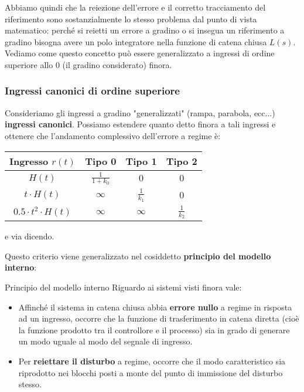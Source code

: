 \documentclass[a4paper,11pt]{article}
\begin{document}
Abbiamo quindi che la reiezione dell'errore e il corretto tracciamento del riferimento sono sostanzialmente lo stesso problema dal punto di vista matematico: perché si reietti un errore a gradino o si insegua un riferimento a gradino bisogna avere un polo integratore nella funzione di catena chiusa $L(s)$.
Vediamo come questo concetto può essere generalizzato a ingressi di ordine superiore allo 0 (il gradino considerato) finora.

\subsubsection{Ingressi canonici di ordine superiore}
Consideriamo gli ingressi a gradino "generalizzati" (rampa, parabola, ecc...) \textbf{ingressi canonici}.
Possiamo estendere quanto detto finora a tali ingressi e ottenere che l'andamento complessivo dell'errore a regime è:
\begin{table}[H]
	\center {}
	\begin{tabular} { c || c | c | c }
		\bfseries Ingresso $r(t)$ & \bfseries Tipo 0 & \bfseries Tipo 1 & \bfseries Tipo 2 \\
		\hline
		$H(t)$ & $\frac{1}{1 + k_0}$ & $0$ & $0$ \\
		$t \cdot H(t)$ & $\infty$ & $\frac{1}{k_1}$ & $0$ \\
		$0.5 \cdot t^2 \cdot H(t)$ & $\infty$ & $\infty$ & $\frac{1}{k_2}$ \\
	\end{tabular}
\end{table}
e via dicendo.

Questo criterio viene generalizzato nel cosiddetto \textbf{principio del modello interno}:
\begin{theorem}{Principio del modello interno}
	Riguardo ai sistemi visti finora vale:
	\begin{itemize}
		\item 
			Affinché il sistema in catena chiusa abbia \textbf{errore nullo} a regime in risposta ad un ingresso, occorre che la funzione di trasferimento in catena diretta (cioè la funzione prodotto tra il controllore e il processo) sia in grado di generare un modo uguale al modo del segnale di ingresso.
		\item
			Per \textbf{reiettare il disturbo} a regime, occorre che il modo caratteristico sia riprodotto nei blocchi posti a monte del punto di immissione del disturbo stesso.
	\end{itemize}
\end{theorem}
\end{document}
